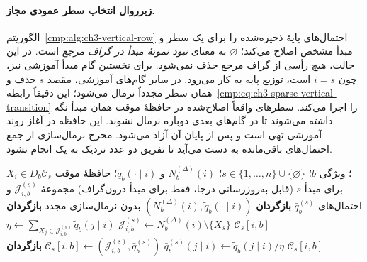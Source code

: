 \paragraph{زیرروال انتخاب سطر عمودی مجاز.}
الگوریتم~\ref{cmp:alg:ch3-vertical-row}
احتمال‌های پایهٔ ذخیره‌شده را
برای یک سطر و مبدأ مشخص اصلاح
می‌کند؛ $\varnothing$ به معنای
\emph{نبود نمونهٔ مبدأ در گراف مرجع}
است. در این حالت، هیچ رأسی از
گراف مرجع حذف نمی‌شود. برای نخستین
گام مبدأ آموزشی نیز، چون $i=s$
است، توزیع پایه به کار می‌رود.
در سایر گام‌های آموزشی، مقصد
$s$ حذف و همان سطر مجدداً
نرمال می‌شود؛ این دقیقاً
رابطه~\eqref{cmp:eq:ch3-sparse-vertical-transition}
را اجرا می‌کند. سطرهای واقعاً اصلاح‌شده در حافظهٔ
موقت همان مبدأ نگه داشته می‌شوند تا در گام‌های
بعدی دوباره نرمال نشوند. این حافظه در آغاز
روند آموزشی تهی است و پس از پایان آن آزاد می‌شود.
مخرج نرمال‌سازی از جمع احتمال‌های باقی‌مانده
به دست می‌آید تا تفریق دو عدد نزدیک به یک
انجام نشود.

\begin{algorithm}[!htbp]
\caption{زیرروال $\operatorname{VerticalRow}$: حذف مبدأ و نرمال‌سازی سطر}
\label{cmp:alg:ch3-vertical-row}
\begin{algorithmic}[1]
\REQUIRE $X_i\in D_b$؛ ویژگی $b$؛
$s\in\{1,\ldots,n\}\cup\{\varnothing\}$؛
$N_b^{(\Delta)}(i)$ و $\widetilde q_b(\cdot\mid i)$؛
حافظهٔ موقت $\mathcal C_s$ برای مبدأ $s$
(قابل به‌روزرسانی درجا، فقط برای مبدأ درون‌گراف)
\ENSURE مجموعهٔ $\mathcal J_{i,b}^{(s)}$
و احتمال‌های $\bar q_b^{(s)}$
    \STATE \textbf{بازگردان}
    $(N_b^{(\Delta)}(i),\widetilde q_b(\cdot\mid i))$
    بدون نرمال‌سازی مجدد
\ENDIF
{}
    \STATE \textbf{بازگردان} $\mathcal C_s[i,b]$
\ENDIF
\STATE $\mathcal J_{i,b}^{(s)}\gets N_b^{(\Delta)}(i)\setminus\{X_s\}$
\STATE $\eta\gets\sum_{X_j\in\mathcal J_{i,b}^{(s)}}\widetilde q_b(j\mid i)$
    \STATE $\bar q_b^{(s)}(j\mid i)\gets\widetilde q_b(j\mid i)/\eta$
\ENDFOR
\STATE $\mathcal C_s[i,b]\gets(\mathcal J_{i,b}^{(s)},\bar q_b^{(s)})$
\STATE \textbf{بازگردان} $\mathcal C_s[i,b]$
\end{algorithmic}
\end{algorithm}

